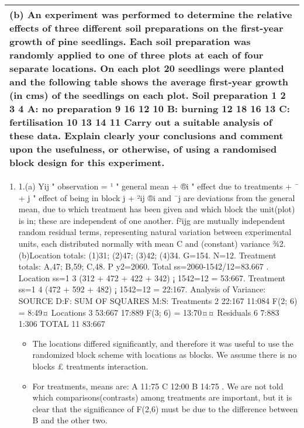 \documentclass[a4paper,12pt]{article}
\begin{document}
\begin{table}[ht!]
 
\centering
 
\begin{tabular}{|p{15cm}|}
 
\hline  

(b) An experiment was performed to determine the relative effects of three different soil preparations on the first-year growth of pine seedlings.  Each soil preparation was randomly applied to one of three plots at each of four separate locations.  On each plot 20 seedlings were planted and the following table shows the average first-year growth (in cms) of the seedlings on each plot.
Soil preparation        1         2        3 4 A: no preparation        9        16      12 10 B: burning      12        18      16 13 C: fertilisation      10        13      14 11  Carry out a suitable analysis of these data.  Explain clearly your conclusions and comment upon the usefulness, or otherwise, of using a randomised block design for this experiment.

\\ \hline
  
\end{tabular}

\end{table}
\begin{enumerate}
\item 1.(a) Yij
"
observation
= ¹
"
general mean
+ ®i
"
effect
due to
treatments
+ ¯ + j
"
effect of
being in
block j
+ ²ij
®i and ¯j are deviations from the general mean, due to which treatment has been given and
which block the unit(plot) is in; these are independent of one another.
f²ijg are mutually independent random residual terms, representing natural variation between
experimental units, each distributed normally with mean C and (constant) variance ¾2.
(b)Location totals: (1)31; (2)47; (3)42; (4)34. G=154. N=12.
Treatment totals: A,47; B,59; C,48.
P
y2=2060.
Total ss=2060-1542/12=83.667 .
Location ss=1
3 (312 + 472 + 422 + 342) ¡ 1542=12 = 53:667.
Treatment ss=1
4 (472 + 592 + 482) ¡ 1542=12 = 22:167.
Analysis of Variance:
SOURCE D:F: SUM OF SQUARES M:S:
Treatments 2 22:167 11:084 F(2; 6) = 8:49¤
Locations 3 53:667 17:889 F(3; 6) = 13:70¤¤
Residuals 6 7:883 1:306
TOTAL 11 83:667

\begin{itemize}
    \item The locations differed significantly, and therefore it was useful to use the randomized block scheme
with locations as blocks. We assume there is no blocks £ treatments interaction.
\item  For treatments, means are: A 11:75
C 12:00
B 14:75
. We are not told which comparisons(contrasts) among
treatments are important, but it is clear that the significance of F(2,6) must be due to the difference
between B and the other two.
\end{itemize}


\end{enumerate}
\end{document}
